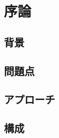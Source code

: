 \documentclass[twoside,11pt,a4paper]{jsbook}
\begin{document}
\clearpage

\tableofcontents
\clearpage
\listoffigures
\clearpage
\listoftables
\clearpage
\mainmatter


\chapter{序論}

\section{背景}

\section{問題点}

\section{アプローチ}

\section{構成}

%
%
\end{document}
